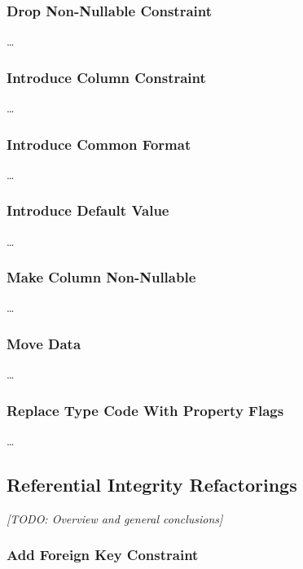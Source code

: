 \documentclass{acm_proc_article-sp}
\begin{document}
\subsubsection{Drop Non-Nullable Constraint}

\ldots

\subsubsection{Introduce Column Constraint}

\ldots

\subsubsection{Introduce Common Format}

\ldots

\subsubsection{Introduce Default Value}

\ldots

\subsubsection{Make Column Non-Nullable}

\ldots

\subsubsection{Move Data}

\ldots

\subsubsection{Replace Type Code With Property Flags}

\ldots

\subsection{Referential Integrity Refactorings}

\textit{[TODO: Overview and general conclusions]}

\subsubsection{Add Foreign Key Constraint}
\end{document}
